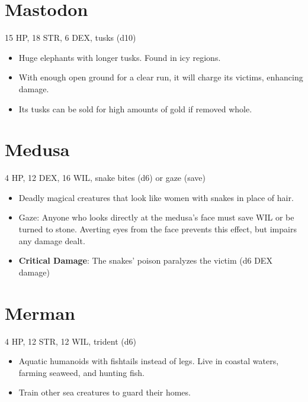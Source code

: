 \documentclass[
  10pt,
  american,
]{article}
\begin{document}
\hypertarget{mastodon}{%
\section{Mastodon}\label{mastodon}}

15 HP, 18 STR, 6 DEX, tusks (d10)

\begin{samepage}
\begin{itemize}
\setlength\itemsep{-.5em}
\item Huge elephants with longer tusks. Found in icy regions.
\item With enough open ground for a clear run, it will charge its victims, enhancing damage.
\item Its tusks can be sold for high amounts of gold if removed whole.
\end{itemize}
\end{samepage}

\hypertarget{medusa}{%
\section{Medusa}\label{medusa}}

4 HP, 12 DEX, 16 WIL, snake bites (d6) or gaze (save)

\begin{samepage}
\begin{itemize}
\setlength\itemsep{-.5em}
\item Deadly magical creatures that look like women with snakes in place of hair.
\item Gaze: Anyone who looks directly at the medusa's face must save WIL or be turned to stone. Averting eyes from the face prevents this effect, but impairs any damage dealt.
\item \textbf{Critical Damage}: The snakes' poison paralyzes the victim (d6 DEX damage)
\end{itemize}
\end{samepage}

\hypertarget{merman}{%
\section{Merman}\label{merman}}

4 HP, 12 STR, 12 WIL, trident (d6)

\begin{samepage}
\begin{itemize}
\setlength\itemsep{-.5em}
\item Aquatic humanoids with fishtails instead of legs. Live in coastal waters, farming seaweed, and hunting fish.
\item Train other sea creatures to guard their homes.
\end{itemize}
\end{samepage}
\end{document}

